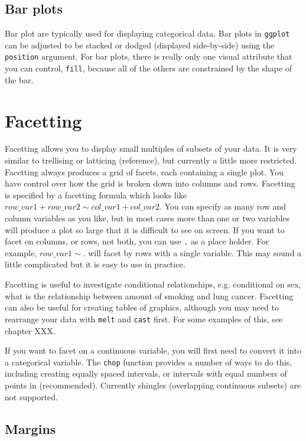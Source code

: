\subsection{Bar plots}\label{sub:bar_plots}

Bar plot are typically used for displaying categorical data.  Bar plots in {\tt ggplot} can be adjusted to be stacked or dodged (displayed side-by-side) using the {\tt position} argument.  For bar plots, there is really only one visual attribute that you can control, {\tt fill}, because all of the others are constrained by the shape of the bar.	



\section{Facetting}\label{sec:facetting}

Facetting allows you to display small multiples of subsets of your data.  It is very similar to trellising or latticing (reference), but currently a little more restricted.  Facetting always produces a grid of facets, each containing a single plot.  You have control over how the grid is broken down into columns and rows.  Facetting is specified by a facetting formula which looks like $row\_var1 + row\_var2 \sim col\_var1 + col\_var2$.  You can specify as many row and column variables as you like, but in most cases more than one or two variables will produce a plot so large that it is difficult to see on screen.  If you want to facet on columns, or rows, not both, you can use {\tt .} as a place holder.  For example, $row\_var1 \sim .$ will facet by rows with a single variable.  This may sound a little complicated but it is easy to use in practice.

Facetting is useful to investigate conditional relationships, e.g. conditional on sex, what is the relationship between amount of smoking and lung cancer.  Facetting can also be useful for creating tables of graphics, although you may need to rearrange your data with {\tt melt} and {\tt cast} first.  For some examples of this, see chapter XXX.

If you want to facet on a continuous variable, you will first need to convert it into a categorical variable.  The {\tt chop} function provides a number of ways to do this, including creating equally spaced intervals, or intervals with equal numbers of points in (recommended).  Currently shingles (overlapping continuous subsets) are not supported.  


\subsection{Margins}\label{sub:margins}


